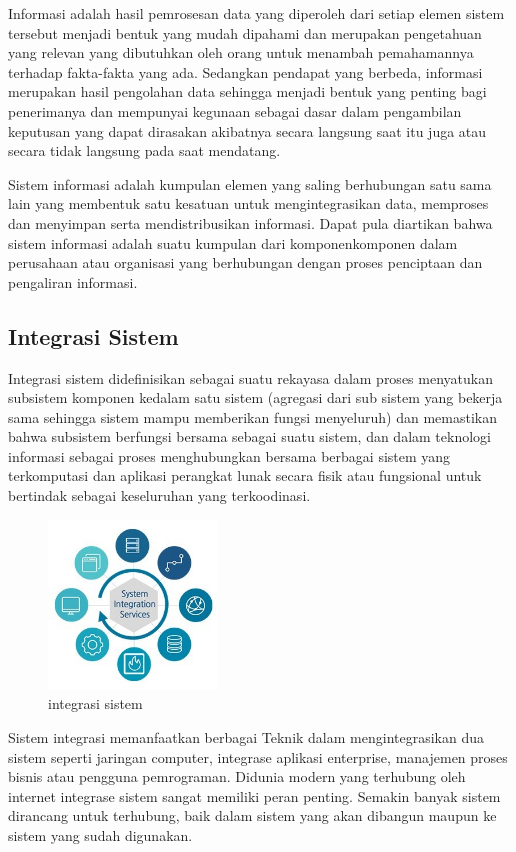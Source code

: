 Informasi adalah hasil pemrosesan data yang diperoleh dari setiap elemen sistem tersebut menjadi bentuk yang mudah dipahami dan merupakan pengetahuan yang relevan yang dibutuhkan oleh orang untuk menambah pemahamannya terhadap fakta-fakta yang ada. Sedangkan pendapat yang berbeda, informasi merupakan hasil pengolahan data sehingga menjadi bentuk yang penting bagi penerimanya dan mempunyai kegunaan sebagai dasar dalam pengambilan keputusan yang dapat dirasakan akibatnya secara langsung saat itu juga atau secara tidak langsung pada saat mendatang. 

Sistem informasi adalah kumpulan elemen yang saling berhubungan satu sama lain yang membentuk satu kesatuan untuk mengintegrasikan data, memproses dan menyimpan serta mendistribusikan informasi. Dapat pula diartikan bahwa sistem informasi adalah suatu kumpulan dari komponenkomponen dalam perusahaan atau organisasi yang berhubungan dengan proses penciptaan dan pengaliran informasi.

\subsection{Integrasi Sistem}
Integrasi sistem didefinisikan sebagai suatu rekayasa dalam proses menyatukan subsistem komponen kedalam satu sistem (agregasi dari sub sistem yang bekerja sama sehingga sistem mampu memberikan fungsi menyeluruh) dan memastikan bahwa subsistem berfungsi bersama sebagai suatu sistem, dan dalam teknologi informasi sebagai proses menghubungkan bersama berbagai sistem yang terkomputasi dan aplikasi perangkat lunak secara fisik atau fungsional untuk bertindak sebagai keseluruhan yang terkoodinasi.

	\begin{figure}[H]
		\includegraphics[width=4.5cm]{figures/integrasi.jpg}
		\centering
		\caption{integrasi sistem}
	\end{figure}
	
Sistem integrasi memanfaatkan berbagai Teknik dalam mengintegrasikan dua sistem seperti jaringan computer, integrase aplikasi enterprise, manajemen proses bisnis atau pengguna pemrograman. 
Didunia modern yang terhubung oleh internet integrase sistem sangat memiliki peran penting. Semakin banyak sistem dirancang untuk terhubung, baik dalam sistem yang akan dibangun maupun ke sistem yang sudah digunakan.

